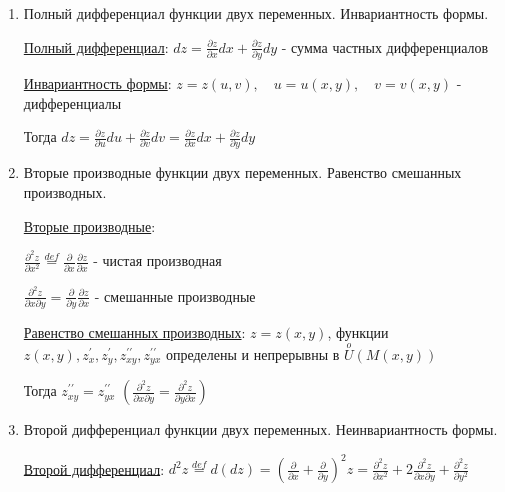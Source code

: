 \documentclass[12pt]{article}
\begin{document}
\begin{enumerate}
        \item Полный дифференциал функции двух переменных. Инвариантность формы.

        \hyperlink{completedifferentialoffunctionoftwovariables}{Полный дифференциал}: $\displaystyle dz = \frac{\partial z}{\partial x} dx + \frac{\partial z}{\partial y} dy$ - сумма частных дифференциалов

        \hyperlink{invariantofdifferentialoffunctionoftwovariables}{Инвариантность формы}: $\displaystyle z = z(u, v), \quad u = u(x, y), \quad v = v(x, y)$ - дифференциалы

        Тогда $\displaystyle dz = \frac{\partial z}{\partial u}du + \frac{\partial z}{\partial v} dv = \frac{\partial z}{\partial x} dx + \frac{\partial z}{\partial y} dy$

        \item Вторые производные функции двух переменных. Равенство смешанных производных.

        \hyperlink{secondderivativeoffunctionoftwovariables}{Вторые производные}:

        $\displaystyle \frac{\partial^2 z}{\partial x^2} \stackrel{def}{=} \frac{\partial}{\partial x} \frac{\partial z}{\partial x}$ - чистая производная

        $\displaystyle \frac{\partial^2 z}{\partial x \partial y} = \frac{\partial}{\partial y} \frac{\partial z}{\partial x}$ - смешанные производные

        \hyperlink{equalityofsecondderivativesoffunctionoftwovariables}{Равенство смешанных производных}: $\displaystyle z = z(x, y)$, функции $\displaystyle z(x, y), z^\prime_x, z^\prime_y, z^{\prime\prime}_{xy}, z^{\prime\prime}_{yx}$ определены и непрерывны в $\displaystyle \stackrel{o}{U}(M(x, y))$

        Тогда $\displaystyle z^{\prime\prime}_{xy} = z^{\prime\prime}_{yx}$ $\left(\frac{\partial^2 z}{\partial x \partial y} = \frac{\partial^2 z}{\partial y \partial x}\right)$

        \item Второй дифференциал функции двух переменных. Неинвариантность формы.

        \hyperlink{seconddifferentialoffunctionoftwovariables}{Второй дифференциал}: $\displaystyle d^2 z \stackrel{def}{=} d(dz) = \left(\frac{\partial}{\partial x} + \frac{\partial}{\partial y}\right)^2 z = \frac{\partial^2 z}{\partial x^2} + 2 \frac{\partial^2 z}{\partial x \partial y} + \frac{\partial^2 z}{\partial y^2}$


\end{enumerate}
\end{document}
